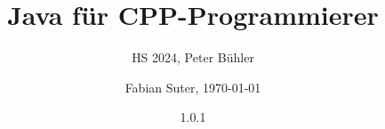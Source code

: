 \documentclass[fontsize=8pt, a4paper, fleqn, landscape, DIV=calc]{scrartcl}
\title{\vspace{-1cm}Java für CPP-Programmierer}
\subtitle{HS 2024, Peter Bühler}
\author{Fabian Suter, \today}
\date{{\small 1.0.1}}
\begin{document}
	\begin{multicols*}{3}
        \raggedcolumns
        \begin{minipage}{0.75\columnwidth}
		      \maketitle
        \end{minipage}
        \begin{minipage}{0.2\columnwidth}
            \begin{center}
                \quad
                \qquad    
            \end{center}
        \end{minipage}
        
        \thispagestyle{fancy}%

        
        
        
        
        
        
        
        
        
        
	\end{multicols*}
\end{document}
